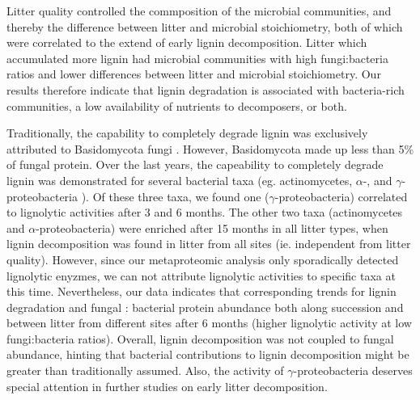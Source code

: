 %
Litter quality controlled the commposition of the microbial communities, and thereby the difference between litter and microbial stoichiometry, both of which were correlated to the extend of early lignin decomposition. Litter which accumulated more lignin had microbial communities with high fungi:bacteria ratios and lower differences between litter and microbial stoichiometry. Our results therefore indicate that lignin degradation is associated with bacteria-rich communities, a low availability of nutrients to decomposers, or both. 

Traditionally, the capability to completely degrade lignin was exclusively attributed to Basidomycota fungi \cite{Berg2008}. However, Basidomycota made up less than 5\% of fungal protein. Over the last years, the capeability to completely degrade lignin was demonstrated for several bacterial taxa (eg. actinomycetes, $\alpha$-, and $\gamma$-proteobacteria \cite{Bugg2011}). Of these three taxa, we found one ($\gamma$-proteobacteria) correlated to lignolytic activities after 3 and 6 months. The other two taxa (actinomycetes and $\alpha$-proteobacteria) were enriched after 15 months in all litter types, when lignin decomposition was found in litter from all sites (ie.  independent from litter quality). However, since our metaproteomic analysis only sporadically detected lignolytic enyzmes, we can not attribute lignolytic activities to specific taxa at this time. Nevertheless, our data indicates that corresponding trends for lignin degradation and fungal : bacterial protein abundance both along succession and between litter from different sites after 6 months (higher lignolytic activity at low fungi:bacteria ratios). Overall, lignin decomposition was not coupled to fungal abundance, hinting that bacterial contributions to lignin decomposition might be greater than traditionally assumed. Also, the activity of $\gamma$-proteobacteria deserves special attention in further studies on early litter decomposition. 


